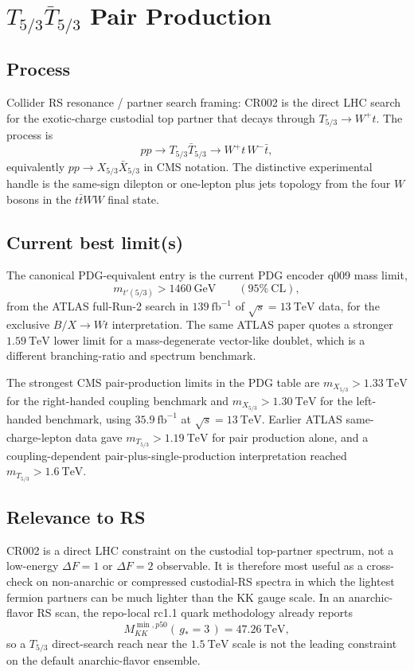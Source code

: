 
\section{\texorpdfstring{\(T_{5/3}\bar T_{5/3}\) Pair Production}{T5/3 Tbar5/3 Pair Production}}

\subsection*{Process}
Collider RS resonance / partner search framing: CR002 is the direct LHC
search for the exotic-charge custodial top partner that decays through
\(T_{5/3}\to W^+t\).  The process is
\[
  pp \to T_{5/3}\bar T_{5/3}
  \to W^+ t\, W^- \bar t ,
\]
equivalently \(pp\to X_{5/3}\bar X_{5/3}\) in CMS notation.  The distinctive
experimental handle is the same-sign dilepton or one-lepton plus jets topology
from the four \(W\) bosons in the \(t\bar tWW\) final state.

\subsection*{Current best limit(s)}
The canonical PDG-equivalent entry is the current PDG encoder q009 mass limit,
\[
  m_{t'(5/3)} > 1460~\mathrm{GeV}\qquad(95\%~\mathrm{CL}),
\]
from the ATLAS full-Run-2 search in \(139~\mathrm{fb}^{-1}\) of
\(\sqrt{s}=13~\mathrm{TeV}\) data, for the exclusive \(B/X\to Wt\)
interpretation.  The same ATLAS paper quotes a stronger
\(1.59~\mathrm{TeV}\) lower limit for a mass-degenerate vector-like doublet,
which is a different branching-ratio and spectrum benchmark.

The strongest CMS pair-production limits in the PDG table are
\(m_{X_{5/3}}>1.33~\mathrm{TeV}\) for the right-handed coupling benchmark and
\(m_{X_{5/3}}>1.30~\mathrm{TeV}\) for the left-handed benchmark, using
\(35.9~\mathrm{fb}^{-1}\) at \(\sqrt{s}=13~\mathrm{TeV}\).  Earlier ATLAS
same-charge-lepton data gave \(m_{T_{5/3}}>1.19~\mathrm{TeV}\) for
pair production alone, and a coupling-dependent pair-plus-single-production
interpretation reached \(m_{T_{5/3}}>1.6~\mathrm{TeV}\).

\subsection*{Relevance to RS}
CR002 is a direct LHC constraint on the custodial top-partner spectrum, not a
low-energy \(\Delta F=1\) or \(\Delta F=2\) observable.  It is therefore most
useful as a cross-check on non-anarchic or compressed custodial-RS spectra in
which the lightest fermion partners can be much lighter than the KK gauge
scale.  In an anarchic-flavor RS scan, the repo-local rc1.1 quark methodology
already reports
\[
  M_{KK}^{\min,p50}(\,g_\ast=3\,)=47.26~\mathrm{TeV},
\]
so a \(T_{5/3}\) direct-search reach near the \(1.5~\mathrm{TeV}\) scale is
not the leading constraint on the default anarchic-flavor ensemble.

